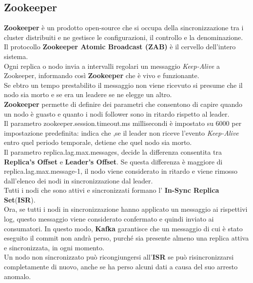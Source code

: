 \documentclass{article}
\begin{document}
\subsection{Zookeeper}
\textbf{Zookeeper} è un prodotto open-source che si occupa della sincronizzazione tra i cluster distribuiti e ne gestisce le configurazioni, il controllo e la denominazione.\\
Il protocollo \textbf{Zookeeper Atomic Broadcast (ZAB)} è il cervello dell'intero sistema.\\
Ogni replica o nodo invia a intervalli regolari un messaggio \textit{ Keep-Alive} a Zookeeper, informando così \textbf{Zookeeper} che è vivo e funzionante. \\
Se ebtro un tempo prestabilito il messaggio non viene ricevuto si presume che il nodo sia morto e se era un leadere se ne elegge un altro.\\
\textbf{Zookeeper} permette di definire dei parametri che consentono di capire quando un nodo è guasto e quanto i nodi follower sono in ritardo rispetto al leader.\\
Il parametro zookeeper.session.timeout.ms millisecondi è impostato su 6000 per impostazione predefinita: indica che ,se il leader non riceve l'evento \textit{ Keep-Alive} entro quel periodo temporale, detiene che quel nodo sia morto.\\
Il parametro replica.lag.max.messages, decide la differenza consentita tra \textbf{Replica's Offset
}e \textbf{Leader's Offset}. Se questa differenza è maggiore di replica.lag.max.message-1, il nodo viene considerato in ritardo e viene rimosso dall'elenco dei nodi in sincronizzazione dal leader. \\
Tutti i nodi che sono attivi e sincronizzati formano l' \textbf{In-Sync Replica Set}(\textbf{ISR}).\\
Ora, se tutti i nodi in sincronizzazione hanno applicato un messaggio ai rispettivi log, questo messaggio viene considerato confermato e quindi inviato ai consumatori. In questo modo, \textbf{Kafka} garantisce che un messaggio di cui è stato eseguito il commit non andrà perso, purché sia presente almeno una replica attiva e sincronizzata, in ogni momento.\\
Un nodo non sincronizzato può ricongiungersi all'\textbf{ISR} se può risincronizzarsi completamente di nuovo, anche se ha perso alcuni dati a causa del suo arresto anomalo.
\end{document}
